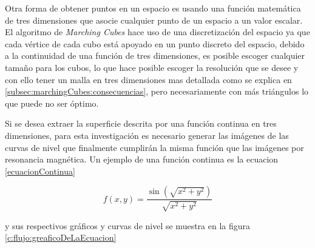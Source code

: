 Otra forma de obtener puntos en un espacio es usando una función matemática de tres dimensiones que asocie cualquier punto de un espacio a un valor escalar. El algoritmo de \emph{Marching Cubes} hace uso de una discretización del espacio ya que cada vértice de cada cubo está apoyado en un punto discreto del espacio, debido a la continuidad de una función de tres dimensiones, es posible escoger cualquier tamaño para los cubos, lo que hace posible escoger la resolución que se desee y con ello tener un malla en tres dimensiones mas detallada como se explica en \ref{subsec:marchingCubes:consecuencias}, pero necesariamente con más triángulos lo que puede no ser óptimo.

Si se desea extraer la superficie descrita por una función continua en tres dimensiones, para esta investigación es necesario generar las imágenes de las curvas de nivel que finalmente cumplirán la misma función que las imágenes por resonancia magnética. Un ejemplo de una función continua es la ecuacion \ref{ecuacionContinua}

\begin{equation}
f(x,y) = \frac{ \sin{(\sqrt{x^2+y^2})} }{ \sqrt{x^2+y^2} }
\label{ecuacionContinua}
\end{equation}

y sus respectivos gráficos y curvas de nivel se muestra en la figura \ref{c:flujo:greaficoDeLaEcuacion}

